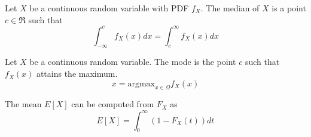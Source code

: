 Let $X$ be a continuous random variable with PDF
$f_X$. The median of $X$ is a point $c \in \Re$ such that
\begin{equation}
    \int_{-\infty}^{c} f_X(x) dx = \int_{c}^{\infty}f_X(x) dx
\end{equation}

Let $X$ be a continuous random variable. The mode is
the point $c$ such that $f_X(x)$ attains the maximum.
\begin{equation}
    x = \text{argmax}_{x \in \Omega} f_X(x)
\end{equation}

The mean $E[X]$ can be computed from
$F_X$ as
\begin{equation}
    E[X] = \int_{0}^{\infty} (1-F_X(t))dt
\end{equation}